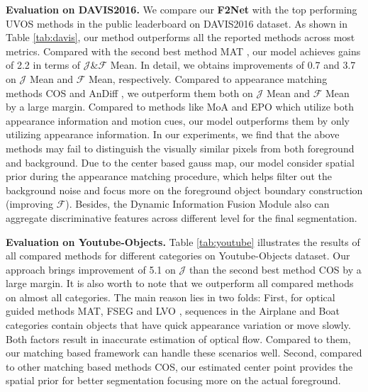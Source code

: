 \documentclass[letterpaper]{article} \usepackage{aaai20}  \usepackage{times}  \usepackage{helvet} \usepackage{courier}  \usepackage[hyphens]{url}  \usepackage{graphicx} \urlstyle{rm} \def\UrlFont{\rm}  \usepackage{graphicx}  \frenchspacing  \setlength{\pdfpagewidth}{8.5in}  \setlength{\pdfpageheight}{11in}  \usepackage{amssymb}
\begin{document}
\noindent \textbf{Evaluation on DAVIS2016.}
We compare our \textbf{F2Net} with the top performing UVOS methods in the public leaderboard on DAVIS2016 dataset. As shown in Table \ref{tab:davis}, our method outperforms all the reported methods across most metrics.  Compared with the second best method MAT \cite{zhou2020motion}, our model achieves gains of 2.2 in terms of $\mathcal{J}$\&$\mathcal{F}$ Mean. In detail, we obtains improvements of 0.7 and 3.7 on $\mathcal{J}$ Mean and $\mathcal{F}$ Mean, respectively.
Compared to appearance matching methods COS \cite{lu2019see} and AnDiff \cite{yang2019anchor}, we outperform them both on $\mathcal{J}$ Mean and $\mathcal{F}$ Mean by a large margin.
Compared to methods like MoA \cite{siam2019video} and EPO \cite{faisal2019exploiting} which utilize both appearance information and motion cues, our model outperforms them by only utilizing appearance information.
In our experiments, we find that the above methods may fail to distinguish the visually similar pixels from both foreground and background.
Due to the center based gauss map, our model consider spatial prior during the appearance matching procedure, which helps filter out the background noise and focus more on the foreground object boundary construction (improving $\mathcal{F}$). 
Besides, the Dynamic Information Fusion Module also can aggregate discriminative features across different level for the final segmentation.


\noindent \textbf{Evaluation on Youtube-Objects.}
Table \ref{tab:youtube} illustrates the results of all compared methods for different categories on Youtube-Objects dataset. Our approach brings improvement of 5.1 on $\mathcal{J}$ than the second best method COS \cite{lu2019see} by a large margin. It is also worth to note that we outperform all compared methods on almost all categories. The main reason lies in two folds: First, for optical guided methods MAT, FSEG \cite{jain2017fusionseg} and LVO \cite{tokmakov2017learning}, sequences in the Airplane
and Boat categories contain objects that have quick appearance variation or move slowly. Both factors result in inaccurate estimation of optical flow.
Compared to them, our matching based framework can handle
these scenarios well. Second, compared to other matching based methods COS, our estimated center point provides the spatial prior for better segmentation focusing more on the actual foreground.
\end{document}
